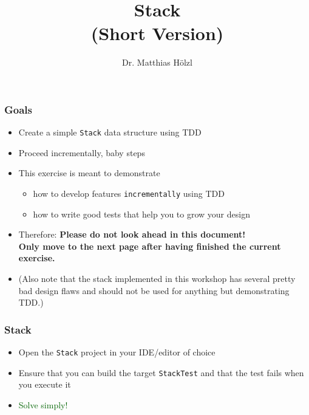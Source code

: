 \documentclass[10pt,aspectratio=169]{beamer}
\author{Dr. Matthias Hölzl}
\begin{document}
\title[Stack]{%
  Stack\\
  (Short Version)}

\begin{frame}
  \maketitle
\end{frame}

\begin{frame}[fragile]
  \frametitle{Goals}
  \begin{itemize}
  \item Create a simple \texttt{Stack} data structure using TDD
  \item Proceed incrementally, baby steps\\[1ex]
  
  \item This exercise is meant to demonstrate
    \begin{itemize}
    \item how to develop features \texttt{incrementally} using TDD
    \item how to write good tests that help you to grow your design 
    \end{itemize}
  \item Therefore: \textbf{Please do not look ahead in this document!\\
      Only move to the next page after having finished the current
      exercise.}
  \item (Also note that the stack implemented in this workshop has several
    pretty bad design flaws and should not be used for anything but
    demonstrating TDD.)
  \end{itemize}
\end{frame}


\begin{frame}[fragile]
  \frametitle{Stack}
  \begin{itemize}
  \item Open the \texttt{Stack} project in your IDE/editor of choice
  \item Ensure that you can build the target \texttt{StackTest} and
    that the test fails when you execute it
  \end{itemize}
  \bigskip
  \begin{itemize}
  \item \textcolor{darkgreen}{Solve simply!}
  \end{itemize}
\end{frame}
\end{document}
